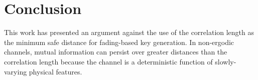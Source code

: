 \documentclass[conference]{ieeetran}
\begin{document}
\section{Conclusion}
This work has presented an argument against the use of the correlation length as the minimum safe distance for fading-based key generation.  In non-ergodic channels, mutual information can persist over greater distances than the correlation length because the channel is a deterministic function of slowly-varying physical features.

{}
\end{document}
